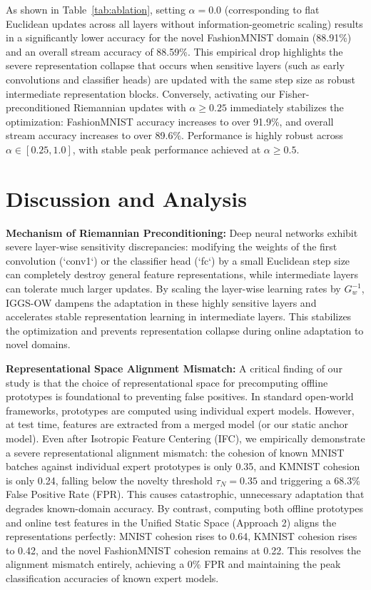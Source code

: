 \documentclass{article}
\theoremstyle{plain}
\theoremstyle{definition}
\theoremstyle{remark}
\begin{document}
As shown in Table~\ref{tab:ablation}, setting $\alpha = 0.0$ (corresponding to flat Euclidean updates across all layers without information-geometric scaling) results in a significantly lower accuracy for the novel FashionMNIST domain (88.91\%) and an overall stream accuracy of 88.59\%. This empirical drop highlights the severe representation collapse that occurs when sensitive layers (such as early convolutions and classifier heads) are updated with the same step size as robust intermediate representation blocks. Conversely, activating our Fisher-preconditioned Riemannian updates with $\alpha \ge 0.25$ immediately stabilizes the optimization: FashionMNIST accuracy increases to over 91.9\%, and overall stream accuracy increases to over 89.6\%. Performance is highly robust across $\alpha \in [0.25, 1.0]$, with stable peak performance achieved at $\alpha \ge 0.5$.

\section{Discussion and Analysis}
\label{sec:discussion}
\textbf{Mechanism of Riemannian Preconditioning:}
Deep neural networks exhibit severe layer-wise sensitivity discrepancies: modifying the weights of the first convolution (`conv1`) or the classifier head (`fc`) by a small Euclidean step size can completely destroy general feature representations, while intermediate layers can tolerate much larger updates. By scaling the layer-wise learning rates by $G_w^{-1}$, IGGS-OW dampens the adaptation in these highly sensitive layers and accelerates stable representation learning in intermediate layers. This stabilizes the optimization and prevents representation collapse during online adaptation to novel domains.

\textbf{Representational Space Alignment Mismatch:}
A critical finding of our study is that the choice of representational space for precomputing offline prototypes is foundational to preventing false positives. In standard open-world frameworks, prototypes are computed using individual expert models. However, at test time, features are extracted from a merged model (or our static anchor model). Even after Isotropic Feature Centering (IFC), we empirically demonstrate a severe representational alignment mismatch: the cohesion of known MNIST batches against individual expert prototypes is only 0.35, and KMNIST cohesion is only 0.24, falling below the novelty threshold $\tau_N = 0.35$ and triggering a 68.3\% False Positive Rate (FPR). This causes catastrophic, unnecessary adaptation that degrades known-domain accuracy. By contrast, computing both offline prototypes and online test features in the Unified Static Space (Approach 2) aligns the representations perfectly: MNIST cohesion rises to 0.64, KMNIST cohesion rises to 0.42, and the novel FashionMNIST cohesion remains at 0.22. This resolves the alignment mismatch entirely, achieving a 0\% FPR and maintaining the peak classification accuracies of known expert models.
\end{document}
